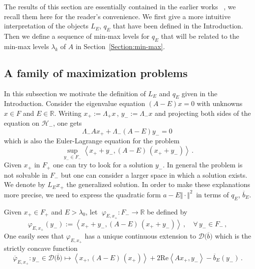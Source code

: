 \documentclass[12pt,reqno]{amsart}
\newcommand{\innerproduct}[2]{\left\langle #1, #2 \right\rangle}
\newcommand{\R}{{\mathbb R}}
\renewcommand{\(}{\left(}
\renewcommand{\)}{\right)}
\renewcommand{\Re}{\mathrm{Re}}
\begin{document}
The results of this section are essentially contained in the earlier works ~\cite{DES00a,EstLos-08,SST20}, we recall them here for the reader's convenience. We first give a more intuitive interpretation of the objects $L_E$, $q_E$ that have been defined in the Introduction. Then we define a sequence of min-max levels for $q_E$ that will be related  to the min-max levels $\lambda_k$ of $A$ in Section~\ref{Section:min-max}. 

\subsection{A family of maximization problems}\label{decomp}
 
In this subsection we motivate the definition of $L_E$ and $q_E$ given in the Introduction. Consider the eigenvalue equation $(A-E)x=0$ with unknowns $x\in F$ and $E\in \mathbb R$. Writing $x_+:=\Lambda_+x\,$, $y_-:=\Lambda_-x$ and projecting both sides of the equation on $\mathcal H_-$,
 one gets
\[\Lambda_-Ax_++\Lambda_-(A-E)y_-=0\,\]
which is also the Euler-Lagrange equation for the problem
\[\sup_{y_-\in F_-} \innerproduct{x_++y_-}{(A-E)\,(x_++y_-)}\,.\]
Given $x_+$ in $F_+$ one can try to look for a solution $y_-$. In general the problem is not solvable in $F_-$ but one can consider a larger space in which a solution exists. We denote by $L_Ex_+$ the generalized solution. In order to make these explanations more precise, we need to express the quadratic form $a-E\Vert \cdot\Vert^2\,$ in terms of $q_E$, $\overline{b}_E$.
 
 Given $x_+\in F_+$ and $E>\lambda_0$, let $\;\varphi_{E, x_+}: F_- \rightarrow \R$ be defined by
\[
\varphi_{E, x_+}(y_-):= \innerproduct{x_++y_-}{(A-E)\,(x_++y_-)} \,,\quad\forall\,y_-\in F_-\,,
\]
One easily sees that $\varphi_{E, x_+}$ has a unique continuous extension to $\mathcal D\big(\overline{b}\big)$ which is the strictly concave function
\[
\overline{\varphi}_{E, x_+}:y_-\in \mathcal D\big(\overline{b}\big)\mapsto \innerproduct{x_+}{(A-E)\,(x_+)}+2\Re\innerproduct{Ax_+}{y_-} -\overline{b}_E(y_-) \,.
\]
\end{document}
